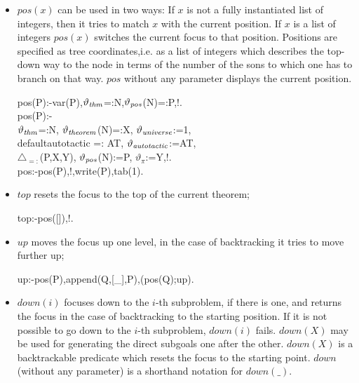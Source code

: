 \documentclass[11pt]{report}
\makeatletter
\newcommand{\inv}[1]{\index{#1}}
\newcommand{\ulinv}[1]{\index{#1@\texttt{#1}}}
\makeatother
\begin{document}
\begin{itemize}
  
 \item
 $pos(x)$ can be used in two ways: If $x$ is not a fully instantiated
 list of integers, then it tries to match $x$ with the current 
 position. If $x$ is a list of integers $pos(x)$ switches the
 current focus to that position.  Positions are
 specified as tree coordinates,i.e. as a list of integers
 which describes the top-down way to the node in terms of
 the number of the sons to which one has to branch on that way.
 $pos$ without any parameter displays the current position.
  
 \ulinv{pos} \inv{cproblem}
\begin{sf}\begin{tabbing}
pos(P):-var(P),$\vartheta_{\it thm}$=:N,$\vartheta_{\it pos}$(N)=:P,!.\\[-0.15ex]
pos(P):-\\[-0.15ex]
\hspace{2em}$\vartheta_{\it thm}$=:N, $\vartheta_{\it theorem}$(N)=:X, $\vartheta_{\it universe}$:=1, \\[-0.15ex]
\hspace{2em}defaultautotactic =: AT, $\vartheta_{\it autotactic}$:=AT,\\[-0.15ex]
\hspace{2em}$\triangle_{=:}$(P,X,Y), $\vartheta_{\it pos}$(N):=P, $\vartheta_{\pi}$:=Y,!.\\[-0.15ex]
pos:-pos(P),!,write(P),tab(1).
\end{tabbing}\end{sf}

  
 \item
 $top$ resets the focus to the top of the current theorem;
  
 \ulinv{top}
\begin{sf}\begin{tabbing}
top:-pos([]),!.
\end{tabbing}\end{sf}

  
 \item
 $up$ moves the focus up one level, in the case of backtracking
 it tries to move further up;
  
 \ulinv{up}
\begin{sf}\begin{tabbing}
up:-pos(P),append(Q,[\_\hspace{0.1em}],P),(pos(Q);up).
\end{tabbing}\end{sf}

  
 \item
 $down(i)$ focuses down to the $i$-th subproblem, if there is
 one, and returns the focus in the case of backtracking to the 
 starting position. If it is not possible to go down to the $i$-th 
 subproblem, $down(i)$ fails.
 $down(X)$ may be used for generating the direct subgoals
 one after the other. $down(X)$ is a backtrackable
 predicate which resets the focus to the starting point.
 $down$ (without any parameter) is a shorthand
 notation for $down(\_)$.
  

\end{itemize}
\end{document}
